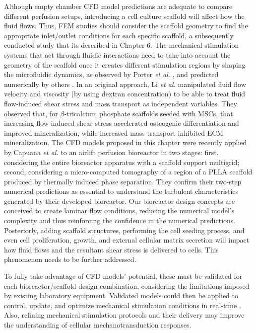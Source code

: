 Although empty chamber \ac{CFD} model predictions are adequate to compare different perfusion setups, introducing a cell culture scaffold will affect how the fluid flows. Thus, \ac{FEM} studies should consider the scaffold geometry to find the appropriate inlet/outlet conditions for each specific scaffold, a subsequently conducted study that its described in Chapter 6. The mechanical stimulation systems that act through fluidic interactions need to take into account the geometry of the scaffold once it creates different stimulation regions by shaping the microfluidic dynamics, as observed by Porter \textit{et al.} \cite{Porter2005-fd}, and predicted numerically by others \cite{Seddiqi2020-ti, Saatchi2020-bg}. In an original approach, Li \textit{et al.} \cite{Li2009-wu} manipulated fluid flow velocity and viscosity (by using dextran concentration) to be able to treat fluid flow-induced shear stress and mass transport as independent variables. They observed that, for $\beta$-tricalcium phosphate scaffolds seeded with \ac{MSCs}, that increasing flow-induced shear stress accelerated osteogenic differentiation and improved mineralization, while increased mass transport inhibited \ac{ECM} mineralization. The \ac{CFD} models proposed in this chapter were recently applied by Capuana \textit{et al.} \cite{Capuana2023-ik} to an airlift perfusion bioreactor in two stages: first, considering the entire bioreactor apparatus with a scaffold support multigrid; second, considering a micro-computed tomography of a region of a \acs{PLLA} scaffold produced by thermally induced phase separation. They confirm their two-step numerical predictions as essential to understand the turbulent characteristics generated by their developed bioreactor. Our bioreactor design concepts are conceived to create laminar flow conditions, reducing the numerical model's complexity and thus reinforcing the confidence in the numerical predictions. Posteriorly, adding scaffold structures, performing the cell seeding process, and even cell proliferation, growth, and external cellular matrix secretion will impact how fluid flows and the resultant shear stress is delivered to cells. This phenomenon needs to be further addressed.  

To fully take advantage of \ac{CFD} models' potential, these must be validated for each bioreactor/scaffold design combination, considering the limitations imposed by existing laboratory equipment. Validated models could then be applied to control, update, and optimize mechanical stimulation conditions in real-time \cite{Post2022-pr}. Also, refining mechanical stimulation protocols and their delivery may improve the understanding of cellular mechanotransduction responses.



